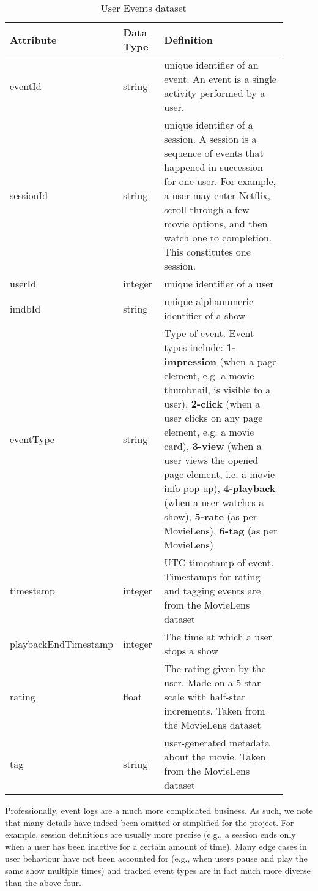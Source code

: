 \documentclass[10pt,titlepage]{article}
\begin{document}
\begin{table}[ht]
    \centering
    \begin{tabular}{p{0.25\linewidth} | p{0.15\linewidth} | p{0.5\linewidth}}
        \hline
        \textbf{Attribute} & \textbf{Data Type} & \textbf{Definition}\\
        \hline
        eventId & string & unique identifier of an event. An event is a single activity performed by a user. \\
        \hline
        sessionId & string & unique identifier of a session. A session is a sequence of events that happened in succession for one user. For example, a user may enter Netflix, scroll through a few movie options, and then watch one to completion. This constitutes one session. \\
        \hline
        userId & integer & unique identifier of a user \\
        \hline
        imdbId & string & unique alphanumeric identifier of a show \\
        \hline
        eventType & string & Type of event. Event types include:
        \textbf{1-impression} (when a page element, e.g. a movie thumbnail, is visible to a user),
        \textbf{2-click} (when a user clicks on any page element, e.g. a movie card),
        \textbf{3-view} (when a user views the opened page element, i.e. a movie info pop-up),
        \textbf{4-playback} (when a user watches a show),
        \textbf{5-rate} (as per MovieLens),
        \textbf{6-tag} (as per MovieLens) \\
        \hline
        timestamp & integer & UTC timestamp of event. Timestamps for rating and tagging events are from the
        MovieLens dataset \\
        \hline
        playbackEndTimestamp & integer & The time at which a user stops a show \\
        \hline
        rating & float & The rating given by the user. Made on a 5-star scale with half-star increments. Taken
        from the MovieLens dataset \\
        \hline
        tag & string & user-generated metadata about the movie. Taken from the MovieLens dataset \\
        \hline
    \end{tabular}
    \caption{User Events dataset}
    \label{tab:user_events}
\end{table}

Professionally, event logs are a much more complicated business. As such, we note that many details have
indeed been omitted or simplified for the project. For example, session definitions are usually more precise (e.g., a
session ends only when a user has been inactive for a certain amount of time). Many edge cases in user behaviour have
not been accounted for (e.g., when users pause and play the same show multiple times) and tracked event types are in
fact much more diverse than the above four.
\end{document}
